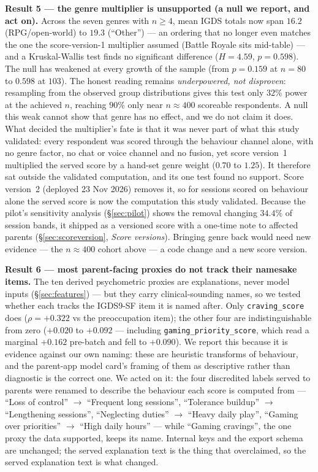 \documentclass[11pt,a4paper]{article}
\begin{document}
\textbf{Result 5 --- the genre multiplier is unsupported (a null we report, and
act on).}
Across the seven genres with $n \geq 4$, mean IGDS totals now span $16.2$
(RPG/open-world) to $19.3$ (``Other'') --- an ordering that no longer even
matches the one the score-version-1 multiplier assumed (Battle Royale sits
mid-table) --- and a Kruskal-Wallis test finds no significant difference
($H = 4.59$, $p = 0.598$). The null has weakened at every growth of the sample
(from $p = 0.159$ at $n{=}80$ to $0.598$ at $103$). The honest reading remains
\emph{underpowered, not disproven}: resampling from the observed group
distributions gives this test only $32\%$ power at the achieved $n$, reaching
$90\%$ only near $n \approx 400$ scoreable respondents. A null this weak cannot
show that genre has no effect, and we do not claim it does. What decided the
multiplier's fate is that it was never part of what this study validated: every
respondent was scored through the behaviour channel alone, with no genre factor,
no chat or voice channel and no fusion, yet score version~1 multiplied the
served score by a hand-set genre weight ($0.70$ to $1.25$). It therefore sat
outside the validated computation, and its one test found no support. Score
version~2 (deployed 23 Nov 2026) removes it, so for sessions scored on behaviour
alone the served score is now the computation this study validated. Because the
pilot's sensitivity analysis (\S\ref{sec:pilot}) shows the removal changing
$34.4\%$ of session bands, it shipped as a versioned score with a one-time note
to affected parents (\S\ref{sec:scoreversion}, \emph{Score versions}). Bringing
genre back would need new evidence --- the $n \approx 400$ cohort above --- a code
change and a new score version.

\textbf{Result 6 --- most parent-facing proxies do not track their namesake
items.} The ten derived psychometric proxies are explanations, never model
inputs (\S\ref{sec:features}) --- but they carry clinical-sounding names, so we
tested whether each tracks the IGDS9-SF item it is named after. Only
\texttt{craving\_score} does ($\rho = +0.322$ vs the preoccupation item);
the other four are indistinguishable from zero ($+0.020$ to $+0.092$ ---
including \texttt{gaming\_priority\_score}, which read a marginal $+0.162$
pre-batch and fell to $+0.090$). We report this because it is evidence against
our own naming: these are heuristic transforms of behaviour, and the parent-app
model card's framing of them as descriptive rather than diagnostic is the
correct one. We acted on it: the four discredited labels served to parents were
renamed to describe the behaviour each score is computed from ---
``Loss of control'' $\rightarrow$ ``Frequent long sessions'', ``Tolerance
buildup'' $\rightarrow$ ``Lengthening sessions'', ``Neglecting duties''
$\rightarrow$ ``Heavy daily play'', ``Gaming over priorities'' $\rightarrow$
``High daily hours'' --- while ``Gaming cravings'', the one proxy the data
supported, keeps its name. Internal keys and the export schema are unchanged;
the served explanation text is the thing that overclaimed, so the served
explanation text is what changed.
\end{document}
